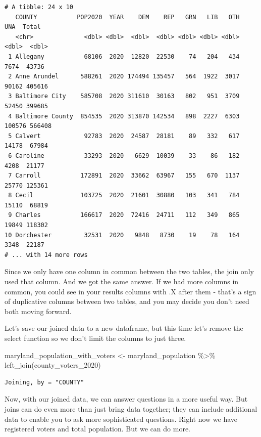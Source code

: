 \documentclass[
  letterpaper,
  DIV=11,
  numbers=noendperiod]{scrreprt}
\newenvironment{Shaded}{\begin{snugshade}}{\end{snugshade}}
\newcommand{\FunctionTok}[1]{\textcolor[rgb]{0.28,0.35,0.67}{#1}}
\newcommand{\NormalTok}[1]{\textcolor[rgb]{0.00,0.23,0.31}{#1}}
\newcommand{\OtherTok}[1]{\textcolor[rgb]{0.00,0.23,0.31}{#1}}
\newcommand{\SpecialCharTok}[1]{\textcolor[rgb]{0.37,0.37,0.37}{#1}}
\begin{document}
\begin{verbatim}
# A tibble: 24 x 10
   COUNTY           POP2020  YEAR    DEM    REP   GRN   LIB   OTH    UNA  Total
   <chr>              <dbl> <dbl>  <dbl>  <dbl> <dbl> <dbl> <dbl>  <dbl>  <dbl>
 1 Allegany           68106  2020  12820  22530    74   204   434   7674  43736
 2 Anne Arundel      588261  2020 174494 135457   564  1922  3017  90162 405616
 3 Baltimore City    585708  2020 311610  30163   802   951  3709  52450 399685
 4 Baltimore County  854535  2020 313870 142534   898  2227  6303 100576 566408
 5 Calvert            92783  2020  24587  28181    89   332   617  14178  67984
 6 Caroline           33293  2020   6629  10039    33    86   182   4208  21177
 7 Carroll           172891  2020  33662  63967   155   670  1137  25770 125361
 8 Cecil             103725  2020  21601  30880   103   341   784  15110  68819
 9 Charles           166617  2020  72416  24711   112   349   865  19849 118302
10 Dorchester         32531  2020   9848   8730    19    78   164   3348  22187
# ... with 14 more rows
\end{verbatim}

Since we only have one column in common between the two tables, the join
only used that column. And we got the same answer. If we had more
columns in common, you could see in your results columns with .X after
them - that's a sign of duplicative columns between two tables, and you
may decide you don't need both moving forward.

Let's save our joined data to a new dataframe, but this time let's
remove the select function so we don't limit the columns to just three.

\begin{Shaded}
\begin{Highlighting}[]
\NormalTok{maryland\_population\_with\_voters }\OtherTok{\textless{}{-}}\NormalTok{ maryland\_population }\SpecialCharTok{\%\textgreater{}\%} \FunctionTok{left\_join}\NormalTok{(county\_voters\_2020)}
\end{Highlighting}
\end{Shaded}

\begin{verbatim}
Joining, by = "COUNTY"
\end{verbatim}

Now, with our joined data, we can answer questions in a more useful way.
But joins can do even more than just bring data together; they can
include additional data to enable you to ask more sophisticated
questions. Right now we have registered voters and total population. But
we can do more.
\end{document}
